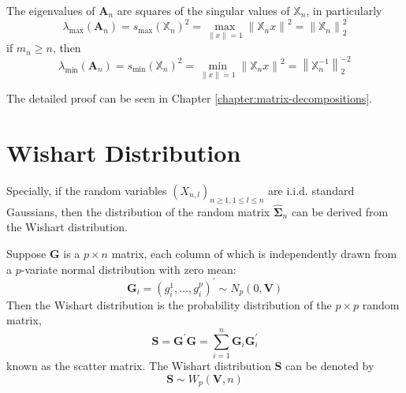 \begin{theorem}
    The eigenvalues of $\mathbf{A}_{n}$ are squares of the singular values of $\mathbb{X}_{n}$, in particularly
    \begin{equation}
        \lambda_{\max}\left(\mathbf{A}_{n}\right)=s_{\max}\left(\mathbb{X}_{n}\right)^{2}=\max_{\|x\|=1}\left\|\mathbb{X}_{n}x\right\|^{2}=\left\|\mathbb{X}_{n}\right\|_{2}^{2}
    \end{equation}
    if $m_{n}\geq n$, then
    \begin{equation}
        \lambda_{\min}\left(\mathbf{A}_{n}\right)=s_{\min}\left(\mathbb{X}_{n}\right)^{2}=\min_{\|x\|=1}\left\|\mathbb{X}_{n}x\right\|^{2}=\left\|\mathbb{X}_{n}^{-1}\right\|_{2}^{-2}
    \end{equation}
\end{theorem}
\begin{remark}
    The detailed proof can be seen in Chapter \ref{chapter:matrix-decompositions}.
\end{remark}

\section{Wishart Distribution}

Specially, if the random variables $\left(X_{n,l}\right)_{n\geq 1,1\leq l\leq n}$ are i.i.d. standard Gaussians, then the distribution of the random matrix $\widehat{\boldsymbol{\Sigma}}_{n}$ can be derived from the Wishart distribution.

\begin{definition}
    Suppose $\mathbf{G}$ is a $p\times n$ matrix, each column of which is independently drawn from a $p$-variate normal distribution with zero mean:
    \begin{equation*}
        \mathbf{G}_{i}=\left(g_{i}^{1},\ldots,g_{i}^{p}\right)^{\prime}\sim N_{p}(0,\mathbf{V})
    \end{equation*}
    Then the Wishart distribution is the probability distribution of the $p\times p$ random matrix,
    \begin{equation}
        \mathbf{S}=\mathbf{G}^{\prime}\mathbf{G}=\sum_{i=1}^{n}\mathbf{G}_{i}\mathbf{G}_{i}^{\prime}
    \end{equation}
    known as the scatter matrix. The Wishart distribution $\mathbf{S}$ can be denoted by
    \begin{equation*}
        \mathbf{S}\sim W_{p}(\mathbf{V},n)
    \end{equation*}
\end{definition}

